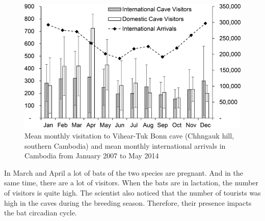 \documentclass[draft, final]{report}
\begin{document}
\begin{figure}[!ht]
  \centering
  \includegraphics[scale=5]{LateX/Images/batreproductioncambodgia.png}
  \caption{Mean monthly visitation to Vihear-Tuk Bonn cave (Chhngauk hill, southern Cambodia) and mean monthly international arrivals in Cambodia from January 2007 to May 2014\cite{graph1batpopulation}\label{graphbat3}}
\end{figure}
In March and April a lot of bats of the two species are pregnant. And in the same time, there are a lot of visitors. When the bats are in lactation, the number of visitors is quite high. The scientist also noticed that the number of tourists was high in the caves during the breeding season. Therefore, their presence impacts the bat circadian cycle. \\

\newpage
\end{document}
